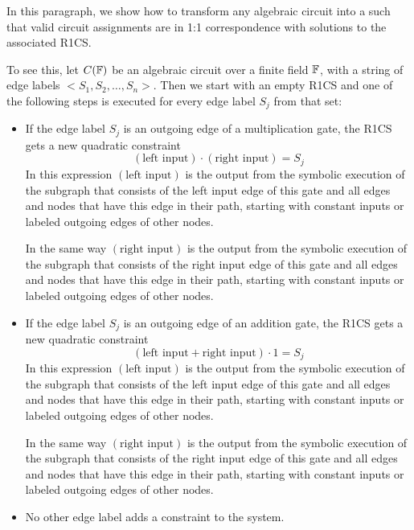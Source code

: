 In this paragraph, we show how to transform any algebraic circuit into a  such that valid circuit assignments are in 1:1 correspondence with solutions to the associated R1CS. 

To see this, let $C(\mathbb{F})$ be an algebraic circuit over a finite field $\mathbb{F}$, with a string of edge labels $<S_1,S_2,\ldots, S_n>$. Then we start with an empty R1CS and one of the following steps is executed for every edge label $S_j$ from that set:
\begin{itemize}
\label{algebraic-gates}
\item If the edge label $S_j$ is an outgoing edge of a multiplication gate, the R1CS gets a new quadratic constraint
\begin{equation}
(\text{left input})\cdot (\text{right input}) = S_j
\end{equation} 
In this expression $(\text{left input})$ is the output from the symbolic execution of the subgraph that consists of the left input edge of this gate and all edges and nodes that have  this edge in their path, starting with constant inputs or labeled outgoing edges of other nodes. 

In the same way $(\text{right input})$ is the output from the symbolic execution of the subgraph that consists of the right input edge of this gate and all edges and nodes that have this edge in their path, starting with constant inputs or labeled outgoing edges of other nodes.
\item If the edge label $S_j$ is an outgoing edge of an addition gate, the R1CS gets a new quadratic constraint
\begin{equation}
(\text{left input} + \text{right input})\cdot 1 = S_j
\end{equation}  
In this expression $(\text{left input})$ is the output from the symbolic execution of the subgraph that consists of the left input edge of this gate and all edges and nodes that have  this edge in their path, starting with constant inputs or labeled outgoing edges of other nodes. 

In the same way $(\text{right input})$ is the output from the symbolic execution of the subgraph that consists of the right input edge of this gate and all edges and nodes that have this edge in their path, starting with constant inputs or labeled outgoing edges of other nodes.
\item No other edge label adds a constraint to the system.
\end{itemize}

